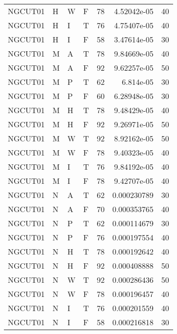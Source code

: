 \begin{table}[!htb]
{\begin{tabular}{llllrrr}
            NGCUT01  & H     & W     & F          & 78         & 4.52042e-05 & 40       \\
            NGCUT01  & H     & I     & T          & 76         & 4.75407e-05 & 40       \\
            NGCUT01  & H     & I     & F          & 58         & 3.47614e-05 & 30       \\
            NGCUT01  & M     & A     & T          & 78         & 9.84669e-05 & 40       \\
            NGCUT01  & M     & A     & F          & 92         & 9.62257e-05 & 50       \\
            NGCUT01  & M     & P     & T          & 62         & 6.814e-05   & 30       \\
            NGCUT01  & M     & P     & F          & 60         & 6.28948e-05 & 30       \\
            NGCUT01  & M     & H     & T          & 78         & 9.48429e-05 & 40       \\
            NGCUT01  & M     & H     & F          & 92         & 9.26971e-05 & 50       \\
            NGCUT01  & M     & W     & T          & 92         & 8.92162e-05 & 50       \\
            NGCUT01  & M     & W     & F          & 78         & 9.40323e-05 & 40       \\
            NGCUT01  & M     & I     & T          & 76         & 9.84192e-05 & 40       \\
            NGCUT01  & M     & I     & F          & 78         & 9.42707e-05 & 40       \\
            NGCUT01  & N     & A     & T          & 62         & 0.000230789 & 30       \\
            NGCUT01  & N     & A     & F          & 70         & 0.000353765 & 40       \\
            NGCUT01  & N     & P     & T          & 62         & 0.000114679 & 30       \\
            NGCUT01  & N     & P     & F          & 76         & 0.000197554 & 40       \\
            NGCUT01  & N     & H     & T          & 78         & 0.000192642 & 40       \\
            NGCUT01  & N     & H     & F          & 92         & 0.000408888 & 50       \\
            NGCUT01  & N     & W     & T          & 92         & 0.000286436 & 50       \\
            NGCUT01  & N     & W     & F          & 78         & 0.000196457 & 40       \\
            NGCUT01  & N     & I     & T          & 76         & 0.000201559 & 40       \\
            NGCUT01  & N     & I     & F          & 58         & 0.000216818 & 30       \\
            \hline
        \end{tabular}
    }{}
\end{table}